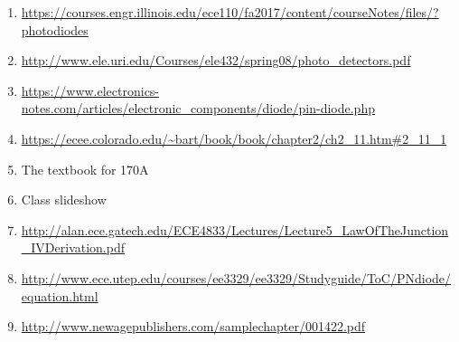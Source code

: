 \begin{enumerate}
	\item \label{ref:packaging_pn_diode} \url{https://courses.engr.illinois.edu/ece110/fa2017/content/courseNotes/files/?photodiodes}
	\item \url{http://www.ele.uri.edu/Courses/ele432/spring08/photo_detectors.pdf}
	\item \url{https://www.electronics-notes.com/articles/electronic_components/diode/pin-diode.php}
	\item \label{ref:thermal_eq} \url{https://ecee.colorado.edu/~bart/book/book/chapter2/ch2_11.htm#2_11_1}
	\item \label{ref:carrier_conc_src} The textbook for 170A
	\item \label{ref:slideshow} Class slideshow
	\item \label{ref:law_of_junction} \url{http://alan.ece.gatech.edu/ECE4833/Lectures/Lecture5_LawOfTheJunction_IVDerivation.pdf}
	\item \label{ref:ideal_diode_src} \url{http://www.ece.utep.edu/courses/ee3329/ee3329/Studyguide/ToC/PNdiode/equation.html}
	\item \label{ref:pn-plot-src} \url{http://www.newagepublishers.com/samplechapter/001422.pdf}
\end{enumerate}
